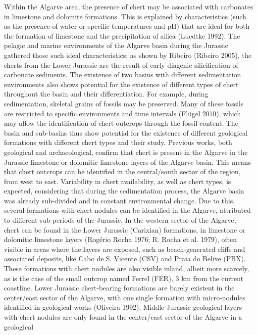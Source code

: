 \documentclass[
  a4paper,
  DIV=11,
  numbers=noendperiod]{scrreprt}
\begin{document}
Within the Algarve area, the presence of chert may be associated with
carbonates in limestone and dolomite formations. This is explained by
characteristics (such as the presence of water or specific temperatures
and pH) that are ideal for both the formation of limestone and the
precipitation of silica (Luedtke 1992). The pelagic and marine
environments of the Algarve basin during the Jurassic gathered those
such ideal characteristics: as shown by Ribeiro (Ribeiro 2005), the
cherts from the Lower Jurassic are the result of early diagenic
silicification of carbonate sediments. The existence of two basins with
different sedimentation environments also shows potential for the
existence of different types of chert throughout the basin and their
differentiation. For example, during sedimentation, skeletal grains of
fossils may be preserved. Many of these fossils are restricted to
specific environments and time intervals (Flügel 2010), which may allow
the identification of chert outcrops through the fossil content. The
basin and sub-basins thus show potential for the existence of different
geological formations with different chert types and their study.
Previous works, both geological and archaeological, confirm that chert
is present in the Algarve in the Jurassic limestone or dolomitic
limestone layers of the Algarve basin. This means that chert outcrops
can be identified in the central/south sector of the region, from west
to east. Variability in chert availability, as well as chert types, is
expected, considering that during the sedimentation process, the Algarve
basin was already sub-divided and in constant environmental change. Due
to this, several formations with chert nodules can be identified in the
Algarve, attributed to different sub-periods of the Jurassic. In the
western sector of the Algarve, chert can be found in the Lower Jurassic
(Carixian) formations, in limestone or dolomitic limestone layers
(Rogério Rocha 1976; R. Rocha et al. 1979), often visible in areas where
the layers are exposed, such as beach-generated cliffs and associated
deposits, like Cabo de S. Vicente (CSV) and Praia do Belixe (PBX). These
formations with chert nodules are also visible inland, albeit more
scarcely, as is the case of the small outcrop named Ferrel (FER), 3 km
from the current coastline. Lower Jurassic chert-bearing formations are
barely existent in the center/east sector of the Algarve, with one
single formation with micro-nodules identified in geological works
(Oliveira 1992). Middle Jurassic geological layers with chert nodules
are only found in the center/east sector of the Algarve in a geological
\end{document}
